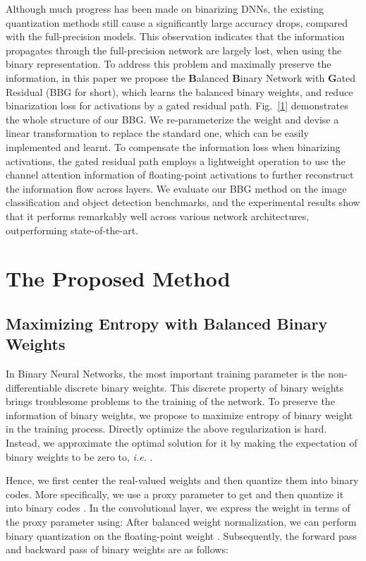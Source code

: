 \documentclass{article}
\newcommand{\ie}{\emph{i.e. }}
\begin{document}
Although much progress has been made on binarizing DNNs, the existing quantization methods still cause a significantly large accuracy drops, compared with the full-precision models. This observation indicates that the information propagates through the full-precision network are largely lost, when using the binary representation. To address this problem and maximally preserve the information, in this paper we propose the \textbf{B}alanced \textbf{B}inary Network with \textbf{G}ated Residual (BBG for short), which learns the balanced binary weights, and reduce binarization loss for activations by a gated residual path. Fig.~\ref{1} demonstrates the whole structure of our BBG. We re-parameterize the weight and devise a linear transformation to replace the standard one, which can be easily implemented and learnt. To compensate the information loss when binarizing activations, the gated residual path employs a lightweight operation to use the channel attention information of floating-point activations to further reconstruct the information flow across layers. We evaluate our BBG method on the image classification and object detection benchmarks, and the experimental results show that it performs remarkably well across various network architectures, outperforming state-of-the-art.


\section{The Proposed Method}


\subsection{Maximizing Entropy with Balanced Binary Weights}
In Binary Neural Networks, the most important training parameter is the non-differentiable discrete binary weights. This discrete property of binary weights brings troublesome problems to the training of the network. To preserve the information of binary weights, we propose to maximize entropy of binary weight in the training process. Directly optimize the above regularization is hard. Instead, we approximate the optimal solution for it by making the expectation of binary weights to be zero to, \ie . 



Hence, we first center the real-valued weights and then quantize them into binary codes. More specifically, we use a proxy parameter  to get  and then quantize it into binary codes . In the convolutional layer, we express the weight  in terms of the proxy parameter  using:	
After balanced weight normalization, we can perform binary quantization on the floating-point weight . Subsequently, the forward pass and backward pass of binary weights are as follows:
\end{document}
